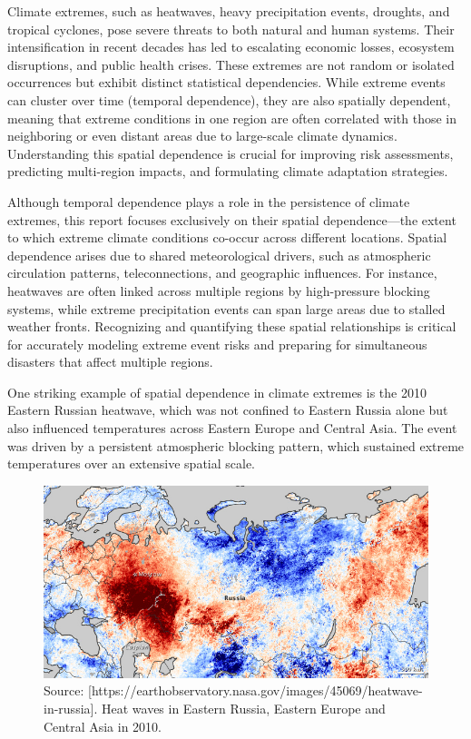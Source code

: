 \documentclass[
]{krantz}
\begin{document}
Climate extremes, such as heatwaves, heavy precipitation events, droughts, and tropical cyclones, pose severe threats to both natural and human systems. Their intensification in recent decades has led to escalating economic losses, ecosystem disruptions, and public health crises. These extremes are not random or isolated occurrences but exhibit distinct statistical dependencies. While extreme events can cluster over time (temporal dependence), they are also spatially dependent, meaning that extreme conditions in one region are often correlated with those in neighboring or even distant areas due to large-scale climate dynamics. Understanding this spatial dependence is crucial for improving risk assessments, predicting multi-region impacts, and formulating climate adaptation strategies.

Although temporal dependence plays a role in the persistence of climate extremes, this report focuses exclusively on their spatial dependence---the extent to which extreme climate conditions co-occur across different locations. Spatial dependence arises due to shared meteorological drivers, such as atmospheric circulation patterns, teleconnections, and geographic influences. For instance, heatwaves are often linked across multiple regions by high-pressure blocking systems, while extreme precipitation events can span large areas due to stalled weather fronts. Recognizing and quantifying these spatial relationships is critical for accurately modeling extreme event risks and preparing for simultaneous disasters that affect multiple regions.

One striking example of spatial dependence in climate extremes is the 2010 Eastern Russian heatwave, which was not confined to Eastern Russia alone but also influenced temperatures across Eastern Europe and Central Asia. The event was driven by a persistent atmospheric blocking pattern, which sustained extreme temperatures over an extensive spatial scale.

\vspace{1em}
\begin{figure}

{\centering \includegraphics[width=0.8\linewidth]{work/06-anthropo/figures/russialsta_heatwave_2010208} 

}

\caption{Source: [https://earthobservatory.nasa.gov/images/45069/heatwave-in-russia]. Heat waves in Eastern Russia, Eastern Europe and Central Asia in 2010.}\label{fig:unnamed-chunk-4}
\end{figure}
\vspace{1em}
\end{document}
